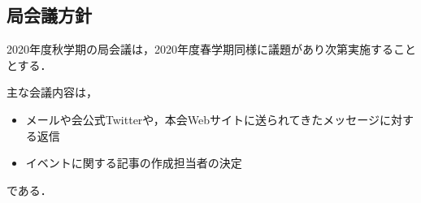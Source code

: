 \subsection*{局会議方針}


2020年度秋学期の局会議は，2020年度春学期同様に議題があり次第実施することとする．


主な会議内容は，
\begin{itemize}
    \item メールや会公式Twitterや，本会Webサイトに送られてきたメッセージに対する返信
    \item イベントに関する記事の作成担当者の決定
\end{itemize}
である．
